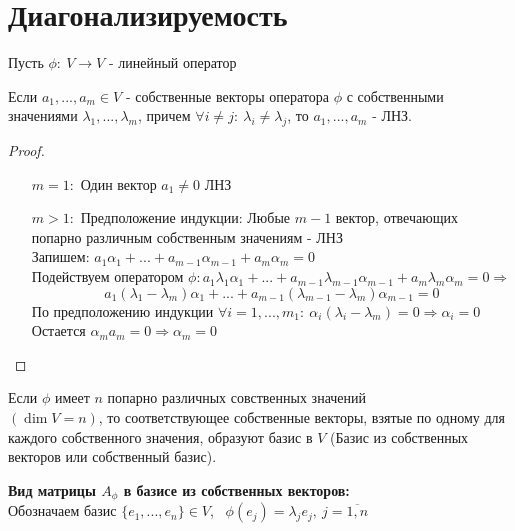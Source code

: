 \section{Диагонализируемость}
    Пусть $\phi: \ V \to V$ - линейный оператор
    \begin{lemma}
        Если $a_1,...,a_m \in V$ - собственные векторы оператора $\phi$ с собственными значениями $\lambda_1,...,\lambda_m$, причем $\forall i \neq j: \ \lambda_i \neq \lambda_j$, то $a_1,...,a_m$ - ЛНЗ.    
    \end{lemma}
    \begin{proof} \tab
        \begin{itemize}
            \item[$m=1:$] Один вектор $a_1 \neq 0$ ЛНЗ
            \item[$m>1:$]  Предположение индукции: Любые $m-1$ вектор, отвечающих попарно различным собственным значениям - ЛНЗ\\
            Запишем: $a_1\alpha_1 + ... + a_{m-1}\alpha_{m-1} + a_m \alpha_m = 0$ \\
            Подействуем оператором $\phi: a_1 \lambda_1\alpha_1 + ... + a_{m-1} \lambda_{m-1}\alpha_{m-1} + a_m  \lambda_m\alpha_m = 0 \Longrightarrow$
            $$a_1 (\lambda_1 - \lambda_m)\alpha_1 + ... + a_{m-1} (\lambda_{m-1} - \lambda_m)\alpha_{m-1} = 0$$ 
            По предположению индукции $\forall i = 1,...,m_1: \ \alpha_i(\lambda_i - \lambda_m)= 0 \Longrightarrow \alpha_i = 0$\\
            Остается $\alpha_ma_m = 0 \Longrightarrow \alpha_m = 0$ 
        \end{itemize}
    \end{proof}
    \begin{consequense}
        Если $\phi$ имеет $n$ попарно различных совственных значений\\ $(\dim V = n)$, то соответствующее собственные векторы, взятые по одному для каждого собственного значения, образуют базис в $V$ (Базис из собственных векторов или собственный базис).
    \end{consequense}
    \textbf{Вид матрицы $A_\phi$ в базисе из собственных векторов:}\\
    Обозначаем базис $\{e_1,...,e_n\} \in V$, \ $\phi(e_j) = \lambda_j e_j, \ j = \overline{1,n}$  \\
